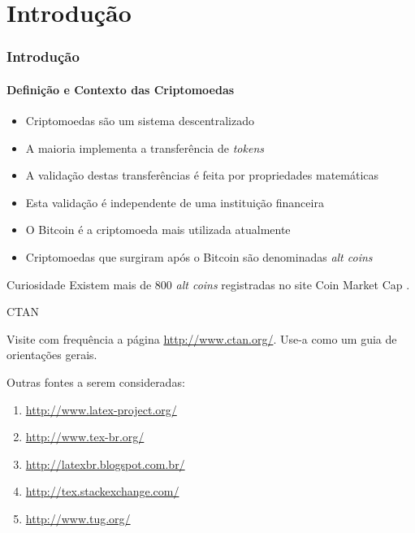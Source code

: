 \documentclass[aspectratio=169]{beamer}
\begin{document}
\section{Introdução}
\begin{frame}
\frametitle{Introdução}
\framesubtitle{Definição e Contexto das Criptomoedas}

\begin{itemize}
    \item Criptomoedas são um sistema descentralizado
        \cite{Prado2017}\pause
    
    \item A maioria implementa a transferência de \emph{tokens}\pause

    \item A validação destas transferências é feita por propriedades
        matemáticas \cite{LChicarino}\pause

    \item Esta validação é independente de uma instituição financeira
        \cite{Nakamoto2008}\pause

    \item O Bitcoin é a criptomoeda mais utilizada atualmente\pause

    \item Criptomoedas que surgiram após o Bitcoin são denominadas
        \emph{alt coins}
\end{itemize}

\pause

\begin{block}{Curiosidade}
    Existem mais de $800$ \emph{alt coins} registradas no site Coin
    Market Cap \cite{Arsov, CoinMarketCap2018}.
\end{block}

\end{frame}

\begin{frame}{CTAN}

Visite com frequência a página \url{http://www.ctan.org/}. 
Use-a como um guia de orientações gerais.
\vspace{0.7cm}

Outras fontes a serem consideradas:
\begin{enumerate}
 \item \url{http://www.latex-project.org/}
 \item \url{http://www.tex-br.org/}
 \item \url{http://latexbr.blogspot.com.br/}
 \item \url{http://tex.stackexchange.com/}
 \item \url{http://www.tug.org/}
\end{enumerate}

\end{frame}
\end{document}
